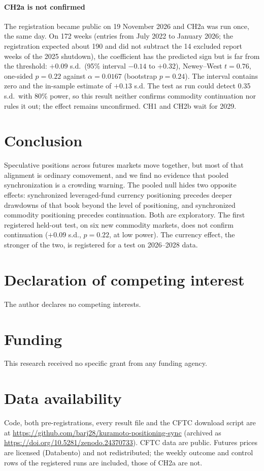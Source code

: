 \documentclass[preprint,12pt,authoryear]{elsarticle}
\begin{document}
\paragraph{CH2a is not confirmed} The registration became public on
19 November 2026 and CH2a was run once, the same day. On 172 weeks (entries
from July 2022 to January 2026; the registration expected about 190 and did
not subtract the 14 excluded report weeks of the 2025 shutdown), the
coefficient has the predicted sign but is far from the threshold: $+0.09$
s.d.\ (95\% interval $-0.14$ to $+0.32$), Newey--West $t=0.76$, one-sided
$p=0.22$ against $\alpha=0.0167$ (bootstrap $p=0.24$). The interval contains
zero and the in-sample estimate of $+0.13$ s.d. The test as run could detect 0.35 s.d.\ with 80\% power, so
this result neither confirms commodity continuation nor rules it out; the
effect remains unconfirmed. CH1 and CH2b wait for 2029.

\section{Conclusion}

Speculative positions across futures markets move together, but most of that
alignment is ordinary comovement, and we find no evidence that pooled
synchronization is a crowding warning. The pooled null hides two opposite effects: synchronized
leveraged-fund currency positioning precedes deeper drawdowns of that book
beyond the level of positioning, and synchronized commodity positioning precedes continuation.
Both are exploratory. The first registered held-out test, on six new
commodity markets, does not confirm continuation ($+0.09$ s.d., $p=0.22$, at
low power). The currency effect, the stronger of the two, is registered for a
test on 2026--2028 data.

\section*{Declaration of competing interest}
The author declares no competing interests.

\section*{Funding}
This research received no specific grant from any funding agency.

\section*{Data availability}
\begin{sloppypar}
Code, both pre-registrations, every result file and the CFTC download script
are at \url{https://github.com/barj28/kuramoto-positioning-sync}
(archived as \url{https://doi.org/10.5281/zenodo.24370733}). CFTC data are public.
Futures prices are licensed (Databento) and not redistributed; the weekly
outcome and control rows of the registered runs are included, those of CH2a
are not.
\end{sloppypar}
\end{document}
